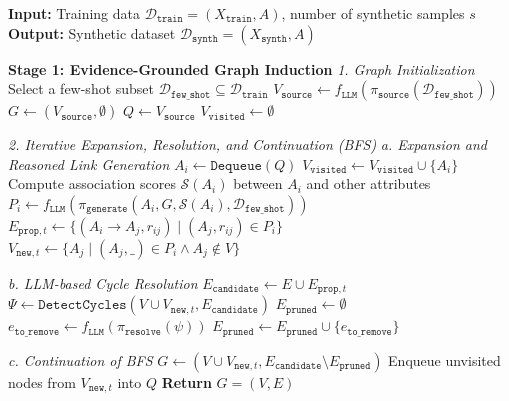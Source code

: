 \begin{algorithm*}
\caption{StructSynth: Structure-Aware Tabular Data Synthesis}
\label{alg:structsynth}
\begin{algorithmic}[1]
\State \textbf{Input:} Training data $\mathcal{D}_{\mathtt{train}} = (X_{\mathtt{train}}, A)$, number of synthetic samples $s$
\State \textbf{Output:} Synthetic dataset $\mathcal{D}_{\mathtt{synth}} = (X_{\mathtt{synth}}, A)$

\vspace{0.2cm}
\Statex \textbf{Stage 1: Evidence-Grounded Graph Induction}
\Statex \textit{1. Graph Initialization}
\State Select a few-shot subset $\mathcal{D}_{\mathtt{few\_shot}} \subseteq \mathcal{D}_{\mathtt{train}}$
\State $V_{\mathtt{source}} \gets f_{\mathtt{LLM}}(\pi_{\mathtt{source}}(\mathcal{D}_{\mathtt{few\_shot}}))$
\State $G \gets (V_{\mathtt{source}}, \emptyset)$
\State $Q \gets V_{\mathtt{source}}$ 
\State $V_{\mathtt{visited}} \gets \emptyset$

\Statex \textit{2. Iterative Expansion, Resolution, and Continuation (BFS)}
    \Statex \hspace{\algorithmicindent} \textit{a. Expansion and Reasoned Link Generation}
    \State $A_i \gets \mathtt{Dequeue}(Q)$
    \State $V_{\mathtt{visited}} \gets V_{\mathtt{visited}} \cup \{A_i\}$
    \State Compute association scores $\mathcal{S}(A_i)$ between $A_i$ and other attributes
    \State $P_i \gets f_{\mathtt{LLM}}(\pi_{\mathtt{generate}}(A_i, G, \mathcal{S}(A_i), \mathcal{D}_{\mathtt{few\_shot}}))$
    \State $E_{\mathtt{prop},t} \gets \{(A_i \to A_j, r_{ij}) \mid (A_j, r_{ij}) \in P_i\}$
    \State $V_{\mathtt{new},t} \gets \{A_j \mid (A_j, \_) \in P_i \land A_j \notin V\}$
    
    \Statex \hspace{\algorithmicindent} \textit{b. LLM-based Cycle Resolution}
    \State $E_{\mathtt{candidate}} \gets E \cup E_{\mathtt{prop},t}$
    \State $\Psi \gets \mathtt{DetectCycles}(V \cup V_{\mathtt{new},t}, E_{\mathtt{candidate}})$
    \State $E_{\mathtt{pruned}} \gets \emptyset$
        \State $e_{\mathtt{to\_remove}} \gets f_{\mathtt{LLM}}(\pi_{\mathtt{resolve}}(\psi))$
        \State $E_{\mathtt{pruned}} \gets E_{\mathtt{pruned}} \cup \{e_{\mathtt{to\_remove}}\}$
    \EndFor
    
    \Statex \hspace{\algorithmicindent} \textit{c. Continuation of BFS}
    \State $G \gets (V \cup V_{\mathtt{new},t}, E_{\mathtt{candidate}} \setminus E_{\mathtt{pruned}})$ 
    \State Enqueue unvisited nodes from $V_{\mathtt{new},t}$ into $Q$
\EndWhile
\State \textbf{Return} $G = (V, E)$


\end{algorithmic}
\end{algorithm*}
